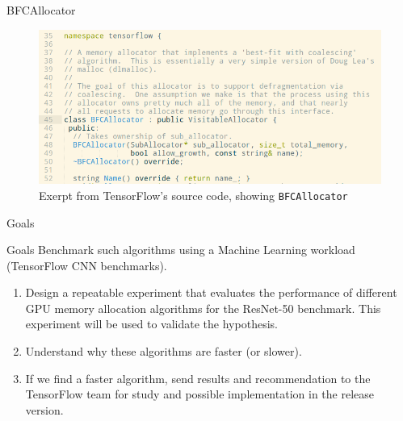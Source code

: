 \documentclass[10pt]{beamer}
\begin{document}
\begin{frame}[fragile]{BFCAllocator}
 \begin{figure}
 \includegraphics[scale=0.4]{images/BFCAllocator.png}
 \caption{Exerpt from TensorFlow's source code, showing \texttt{BFCAllocator}}
 \end{figure}
\end{frame}

%
%
%

\begin{frame}[fragile]{Goals}


\begin{alertblock}{Goals}
Benchmark such algorithms using a Machine Learning workload (TensorFlow CNN benchmarks).
\begin{enumerate}
    \item Design a repeatable experiment that evaluates the performance of different GPU memory allocation algorithms for the ResNet-50 benchmark. This experiment will be used to validate the hypothesis. 
    \item Understand why these algorithms are faster (or slower).
    \item If we find a faster algorithm, send results and recommendation to the TensorFlow team for study and possible implementation in the release version.
\end{enumerate}

\end{alertblock}
\end{frame}
\end{document}
